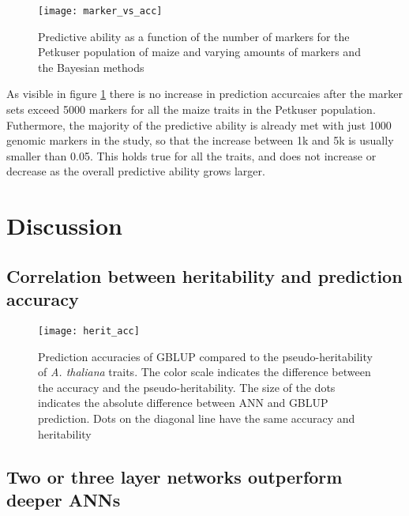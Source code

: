\begin{figure}[H]
 \centering \texttt{[image: marker\_vs\_acc]}
 \decoRule
 \caption[Predictive ability as a function of the number of markers]{Predictive ability as
   a function of the number of markers for the Petkuser population of maize and varying
   amounts of markers and the Bayesian methods}
\label{fig:marker_vs_acc}
\end{figure}

As visible in figure \ref{fig:marker_vs_acc} there is no increase in prediction accurcaies
after the marker sets exceed 5000 markers for all the maize traits in the Petkuser
population. Futhermore, the majority of the predictive ability is already met with just
1000 genomic markers in the study, so that the increase between 1k and 5k is usually
smaller than 0.05. This holds true for all the traits, and does not increase or decrease
as the overall predictive ability grows larger.




\section{Discussion}\label{gpdis}
\subsection{Correlation between heritability and prediction accuracy}

\begin{figure}[H]
 \centering \texttt{[image: herit\_acc]}
 \decoRule
 \caption[Prediction accuracies of GBLUP compared to the heritability of
 \textit{A. thaliana} traits]{Prediction accuracies of GBLUP compared to the
   pseudo-heritability of \textit{A. thaliana} traits. The color scale indicates the
   difference between the accuracy and the pseudo-heritability. The size of the dots
   indicates the absolute difference between ANN and GBLUP prediction. Dots on the
   diagonal line have the same accuracy and heritability}
\label{fig:herit_gp}
\end{figure}


\subsection{Two or three layer networks outperform deeper ANNs}

